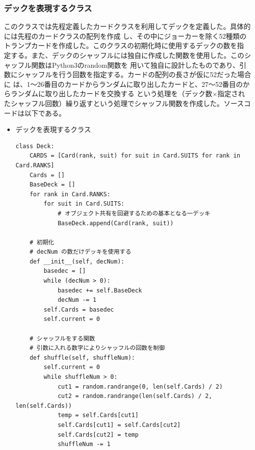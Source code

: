 \subsubsection{デックを表現するクラス}
このクラスでは先程定義したカードクラスを利用してデックを定義した。具体的には先程のカードクラスの配列を作成
し、その中にジョーカーを除く52種類のトランプカードを作成した。このクラスの初期化時に使用するデックの数を指
定する。また、デックのシャッフルには独自に作成した関数を使用した。このシャッフル関数はPython3のrandom関数を
用いて独自に設計したものであり、引数にシャッフルを行う回数を指定する。カードの配列の長さが仮に52だった場合に
は、1～26番目のカードからランダムに取り出したカードと、27～52番目のからランダムに取り出したカードを交換する
という処理を（デック数×指定されたシャッフル回数）繰り返すという処理でシャッフル関数を作成した。ソースコードは以下である。
\begin{itemize}
\item デックを表現するクラス
\begin{lstlisting}
class Deck:
    CARDS = [Card(rank, suit) for suit in Card.SUITS for rank in Card.RANKS]
    Cards = []
    BaseDeck = []
    for rank in Card.RANKS:
        for suit in Card.SUITS:
            # オブジェクト共有を回避するための基本となる一デッキ
            BaseDeck.append(Card(rank, suit))  

    # 初期化
    # decNum の数だけデッキを使用する
    def __init__(self, decNum):
        basedec = []
        while (decNum > 0):
            basedec += self.BaseDeck
            decNum -= 1
        self.Cards = basedec
        self.current = 0

    # シャッフルをする関数
    # 引数に入れる数字によりシャッフルの回数を制御
    def shuffle(self, shuffleNum):
        self.current = 0
        while shuffleNum > 0:
            cut1 = random.randrange(0, len(self.Cards) / 2)
            cut2 = random.randrange(len(self.Cards) / 2, len(self.Cards))
            temp = self.Cards[cut1]
            self.Cards[cut1] = self.Cards[cut2]
            self.Cards[cut2] = temp
            shuffleNum -= 1
\end{lstlisting}
\end{itemize}

